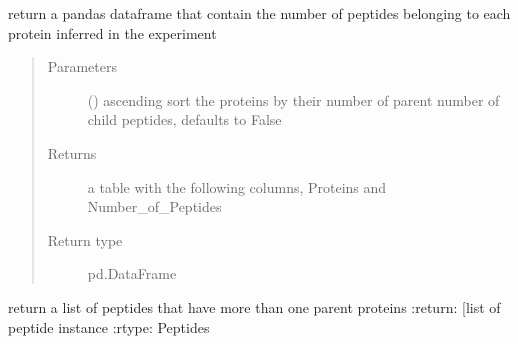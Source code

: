 \documentclass[letterpaper,10pt,english]{sphinxmanual}
\begin{document}
\begin{fulllineitems}
\begin{fulllineitems}
\label{\detokenize{IPTK.Classes:IPTK.Classes.Experiment.Experiment.get_peptides_per_protein}}
return a pandas dataframe that contain the number of peptides belonging to each protein 
inferred in the experiment
\begin{quote}\begin{description}
\item[{Parameters}] \leavevmode
{} (\sphinxstyleliteralemphasis{\sphinxupquote{, }}) \textendash{} ascending sort the proteins by their number of parent number of child peptides, defaults to False

\item[{Returns}] \leavevmode
a table with the following columns, Proteins and Number\_of\_Peptides

\item[{Return type}] \leavevmode
pd.DataFrame

\end{description}\end{quote}

\end{fulllineitems}


\begin{fulllineitems}
\label{\detokenize{IPTK.Classes:IPTK.Classes.Experiment.Experiment.get_poly_parental_peptides}}
return a list of peptides that have more than one parent proteins
:return: {[}list of peptide instance 
:rtype: Peptides

\end{fulllineitems}



\end{fulllineitems}
\end{document}
